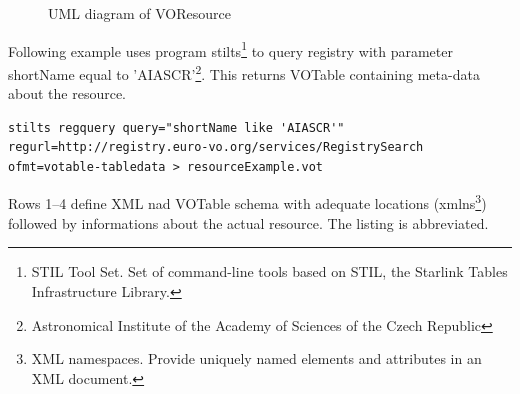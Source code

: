 \begin{figure}[!htbp]
\begin{center}
        \fi
        \caption{UML diagram of VOResource}
        \label{FigResource}
      \end{center}
    \end{figure}

\clearpage

Following example uses program stilts\footnote{STIL Tool Set. Set of
  command-line tools based on STIL, the Starlink Tables Infrastructure
  Library.} to query registry with parameter shortName equal to
'AIASCR'\footnote{Astronomical Institute of the Academy of Sciences of
  the Czech Republic}. This returns VOTable containing meta-data
about the resource. 

\begin{lstlisting}[frame=single]
stilts regquery query="shortName like 'AIASCR'"
regurl=http://registry.euro-vo.org/services/RegistrySearch
ofmt=votable-tabledata > resourceExample.vot
\end{lstlisting}

Rows 1--4 define XML nad VOTable schema with adequate locations
(xmlns\footnote{XML namespaces. Provide uniquely named elements and
  attributes in an XML document.}) followed by informations about the
actual resource. The listing is abbreviated.

  

    

    



